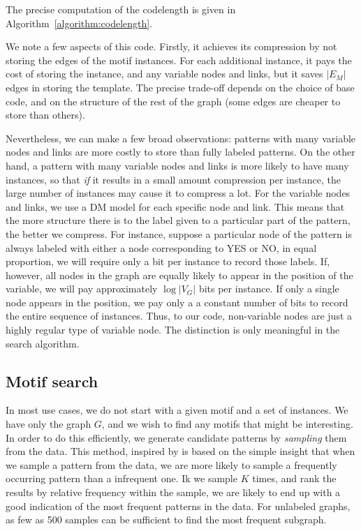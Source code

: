 \documentclass[11pt]{article}
\begin{document}
The precise computation of the codelength is given in Algorithm~\ref{algorithm:codelength}. 

We note a few aspects of this code. Firstly, it achieves its compression by not storing the edges of the motif instances. For each additional instance, it pays the cost of storing the instance, and any variable nodes and links, but it saves $|E_M|$ edges in storing the template. The precise trade-off depends on the choice of base code, and on the structure of the rest of the graph (some edges are cheaper to store than others).

Nevertheless, we can make a few broad observations: patterns with many variable nodes and links are more costly to store than fully labeled patterns. On the other hand, a pattern with many variable nodes and links is more likely to have many instances, so that \emph{if} it results in a small amount compression per instance, the large number of instances may cause it to compress a lot. For the variable nodes and links, we use a DM model for each specific node and link. This means that the more structure there is to the label given to a particular part of the pattern, the better we compress. For instance, suppose a particular node of the pattern is always labeled with either a node corresponding to YES or NO, in equal proportion, we will require only a bit per instance to record those labels. If, however, all nodes in the graph are equally likely to appear in the position of the variable, we will pay approximately $\log |V_G|$ bits per instance. If only a single node appears in the position, we pay only a a constant number of bits to record the entire sequence of instances. Thus, to our code, non-variable nodes are just a highly regular type of variable node. The distinction is only meaningful in the search algorithm.

\subsection{Motif search}

\label{section:search}

In most use cases, we do not start with a given motif and a set of instances. We have only the graph $G$, and we wish to find any motifs that might be interesting. In order to do this efficiently, we generate candidate patterns by \emph{sampling} them from the data. This method, inspired by \cite{kashtan2004efficient} is based on the simple insight that when we sample a pattern from the data, we are more likely to sample a frequently occurring pattern than a infrequent one. Ik we sample $K$ times, and rank the results by relative frequency within the sample, we are likely to end up with a good indication of the most frequent patterns in the data. For unlabeled graphs, as few as 500 samples can be sufficient to find the most frequent subgraph.
\end{document}
